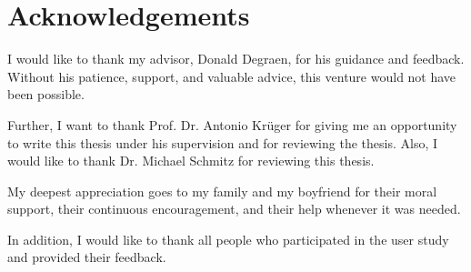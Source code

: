 ﻿\section*{Acknowledgements}
I would like to thank my advisor, Donald Degraen, for his guidance and feedback.
Without his patience, support, and valuable advice, this venture would not have been possible.

Further, I want to thank Prof. Dr. Antonio Krüger for giving me an opportunity to write this
thesis under his supervision and for reviewing the thesis.
Also, I would like to thank Dr. Michael Schmitz for reviewing this thesis.

My deepest appreciation goes to my family and my boyfriend for their moral support, their continuous encouragement,
and their help whenever it was needed.

In addition, I would like to thank all people who participated in the user study and
provided their feedback.
